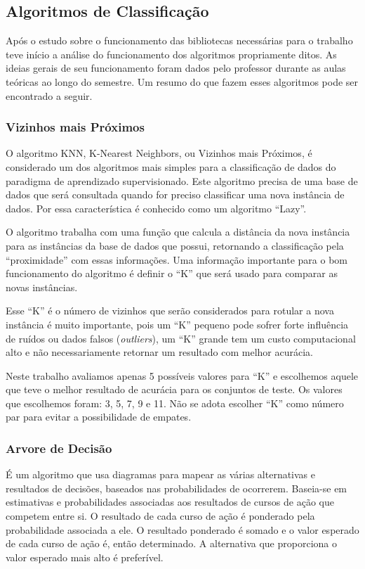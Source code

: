 \documentclass[12pt, a4paper]{article}
\begin{document}
\subsection{Algoritmos de Classificação}
Após o estudo sobre o funcionamento das bibliotecas necessárias para o trabalho teve início a análise do funcionamento dos algoritmos propriamente ditos. As ideias gerais de seu funcionamento foram dados pelo professor durante as aulas teóricas ao longo do semestre. Um resumo do que fazem esses algoritmos pode ser encontrado a seguir.

\subsubsection{Vizinhos mais Próximos}
O algoritmo KNN, K-Nearest Neighbors, ou Vizinhos mais Próximos, é considerado um dos algoritmos mais simples para a classificação de dados do paradigma de aprendizado supervisionado. Este algoritmo precisa de uma base de dados que será consultada quando for preciso classificar uma nova instância de dados. Por essa característica é conhecido como um algoritmo ``Lazy''.

O algoritmo trabalha com uma função que calcula a distância da nova instância para as instâncias da base de dados que possui, retornando a classificação pela ``proximidade'' com essas informações. Uma informação importante para o bom funcionamento do algoritmo é definir o ``K'' que será usado para comparar as novas instâncias.

Esse ``K'' é o número de vizinhos que serão considerados para rotular a nova instância é muito importante, pois um ``K'' pequeno pode sofrer forte influência de  ruídos ou dados falsos (\textit{outliers}), um ``K'' grande tem um custo computacional alto e não necessariamente retornar um resultado com melhor acurácia.

Neste trabalho avaliamos apenas 5 possíveis valores para ``K'' e escolhemos aquele que teve o melhor resultado de acurácia para os conjuntos de teste. Os valores que escolhemos foram: 3, 5, 7, 9 e 11. Não se adota escolher ``K'' como número par para evitar a possibilidade de empates.

\subsubsection{Arvore de Decisão}
É um algoritmo que usa diagramas para mapear as várias alternativas e resultados de decisões, baseados nas probabilidades de ocorrerem. Baseia-se em estimativas e probabilidades associadas aos resultados de cursos de ação que competem entre si. O resultado de cada curso de ação é ponderado pela probabilidade associada a ele. O resultado ponderado é somado e o valor esperado de cada curso de ação é, então determinado. A alternativa que proporciona o valor esperado mais alto é preferível.
\end{document}
